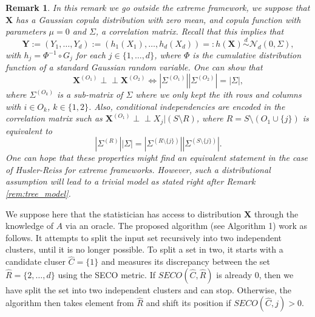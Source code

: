 \documentclass[11pt]{article}
\newtheorem{remark}{Remark}
\newcommand{\indep}{\perp \!\!\! \perp}
\begin{document}
	\begin{remark}
		 \label{rem:gaussian_copula}
		 In this remark we go outside the extreme framework, we suppose that $\textbf{X}$ has a Gaussian copula distribution with zero mean, and copula function with parameters $\mu = 0$ and $\Sigma$, a correlation matrix. Recall that this implies that
		 \begin{equation*}
		 	\textbf{Y} := (Y_1, \dots, Y_d) := (h_1(X_1), \dots, h_d(X_d)) =: h(\textbf{X}) \overset{d}{\sim} \mathcal{N}_d(0, \Sigma),
		 \end{equation*}
		 with $h_j = \Phi^{-1} \circ G_j$ for each $j \in \{1,\dots,d\}$, where $\Phi$ is the cumulative distribution function of a standard Gaussian random variable. One can show that
		 \begin{equation*}
		 	\textbf{X}^{(O_1)} \indep \textbf{X}^{(O_2)} \Longleftrightarrow  |\Sigma^{(O_1)}| |\Sigma^{(O_2)}| = |\Sigma|,
		 \end{equation*}
		 where $\Sigma^{(O_k)}$ is a sub-matrix of $\Sigma$ where we only kept the ith rows and columns with $i \in O_k$, $k \in \{1,2\}$. Also, conditional independencies are encoded in the correlation matrix such as $\textbf{X}^{(O_1)} \indep X_j | (S \setminus R)$, where $R = S \setminus (O_1 \cup \{j\})$ is equivalent to
		 \begin{equation*}
		 	|\Sigma^{(R)}| |\Sigma| = |\Sigma^{(R \setminus \{j\})}| |\Sigma^{(S \setminus \{j\})}|.
		 \end{equation*}
		 One can hope that these properties might find an equivalent statement in the case of Husler-Reiss for extreme frameworks. However, such a distributional assumption will lead to a trivial model as stated right after Remark \ref{rem:tree_model}.
	\end{remark}
	We suppose here that the statistician has access to distribution $\textbf{X}$ through the knowledge of $A$ via an oracle. The proposed algorithm (see Algorithm 1) work as follows. It attempts to split the input set recursively into two independent clusters, until it is no longer possible. To split a set in two, it starts with a candidate cluser $\hat{C} = \{1\}$ and measures its discrepancy between the set $\hat{R} = \{2,\dots,d\}$ using the SECO metric. If $SECO(\hat{C}, \hat{R})$ is already 0, then we have split the set into two independent clusters and can stop. Otherwise, the algorithm then takes element from $\hat{R}$  and shift its position if $SECO(\hat{C}, j) > 0$.
\end{document}
